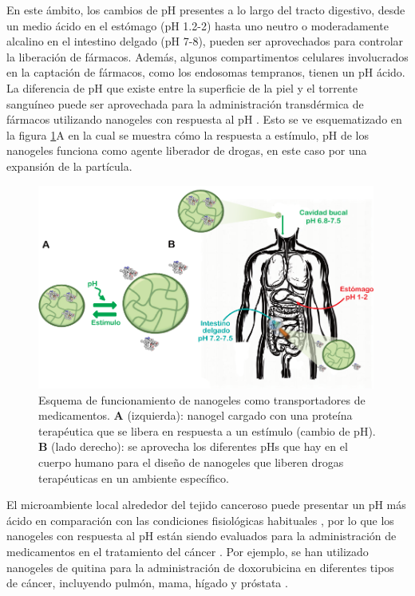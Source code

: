En este \'ambito, los cambios de pH presentes a lo largo del tracto digestivo, desde un medio \'acido en el est\'omago (pH 1.2-2) hasta uno neutro o moderadamente alcalino en el intestino delgado (pH 7-8), pueden ser aprovechados para controlar la liberaci\'on de f\'armacos.
Adem\'as, algunos compartimentos celulares involucrados en la captaci\'on de f\'armacos, como los endosomas tempranos, tienen un pH \'acido. La diferencia de pH que existe entre la superficie de la piel y el torrente sangu\'ineo puede ser aprovechada para la administraci\'on transd\'ermica de f\'armacos utilizando nanogeles con respuesta al pH \cite{qindeel2019development}.
Esto se ve esquematizado en la figura \ref{fig:intro:sistema}A en la cual se muestra c\'omo la respuesta a est\'imulo, pH  de los nanogeles funciona como agente liberador de drogas, en este caso por una expansi\'on de la part\'icula.


\begin{figure}
	\centering
	\includegraphics[width=0.99\textwidth]{Figures/modelos/sistema.pdf}
	\caption{Esquema de funcionamiento de nanogeles como transportadores de medicamentos. 
		\textbf{A} (izquierda): nanogel cargado con una prote\'ina terap\'eutica que se libera en respuesta a un est\'imulo (cambio de pH). \textbf{B} (lado derecho): se aprovecha los diferentes pHs que hay en el cuerpo humano para el dise\~no de nanogeles que liberen drogas terap\'euticas en un ambiente espec\'ifico. }
	\label{fig:intro:sistema}
\end{figure}

El microambiente local alrededor del tejido canceroso puede presentar un pH m\'as \'acido en comparaci\'on con las condiciones fisiol\'ogicas habituales \cite{lawson1963breast,tannock1989acid,gerweck2006tumor}, por lo que los nanogeles con respuesta al pH est\'an siendo evaluados para la administraci\'on de medicamentos en el tratamiento del c\'ancer \cite{peng2013controlled,kanamala2016mechanisms}. Por ejemplo, se han utilizado nanogeles de quitina para la administraci\'on de doxorubicina en diferentes tipos de c\'ancer, incluyendo pulm\'on, mama, h\'igado y pr\'ostata \cite{jayakumar2012doxorubicin}.

